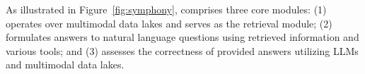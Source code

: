 


As illustrated in Figure~\ref{fig:symphony}, \sys comprises three core modules: 
(1) \discovery operates over multimodal data lakes and serves as the retrieval module; 
(2) \reason formulates answers to natural language questions using retrieved information and various tools; and 
(3) \verify assesses the correctness of provided answers utilizing LLMs and multimodal data lakes.
%

